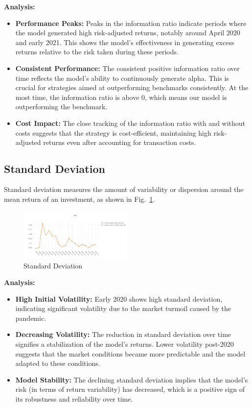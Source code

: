\documentclass[conference]{IEEEtran}
\begin{document}
\textbf{Analysis:}
\begin{itemize}
    \item \textbf{Performance Peaks:} Peaks in the information ratio indicate periods where the model generated high risk-adjusted returns, notably around April 2020 and early 2021. This shows the model's effectiveness in generating excess returns relative to the risk taken during these periods.
    \item \textbf{Consistent Performance:} The consistent positive information ratio over time reflects the model's ability to continuously generate alpha. This is crucial for strategies aimed at outperforming benchmarks consistently. At the most time, the information ratio is above 0, which means our model is outperforming the benchmark.
    \item \textbf{Cost Impact:} The close tracking of the information ratio with and without costs suggests that the strategy is cost-efficient, maintaining high risk-adjusted returns even after accounting for transaction costs.
\end{itemize}

\begin{center}
    \subsection*{\textbf{Standard Deviation}}
\end{center}

Standard deviation measures the amount of variability or dispersion around the mean return of an investment, as shown in Fig.~\ref{fig:standard deviation}.

\begin{figure}[h!]
\centering
    \includegraphics[width=0.5\textwidth]{std.png}
    \caption{Standard Deviation}
    \label{fig:standard deviation}
\end{figure}

\textbf{Analysis:}
\begin{itemize}
    \item \textbf{High Initial Volatility:} Early 2020 shows high standard deviation, indicating significant volatility due to the market turmoil caused by the pandemic.
    \item \textbf{Decreasing Volatility:} The reduction in standard deviation over time signifies a stabilization of the model's returns. Lower volatility post-2020 suggests that the market conditions became more predictable and the model adapted to these conditions.
    \item \textbf{Model Stability:} The declining standard deviation implies that the model's risk (in terms of return variability) has decreased, which is a positive sign of its robustness and reliability over time.
\end{itemize}
\end{document}
